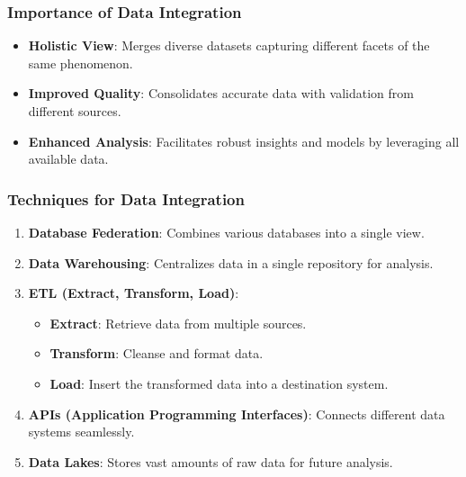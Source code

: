 \documentclass[aspectratio=169]{beamer}
\begin{document}
\begin{frame}[fragile]
    \frametitle{Importance of Data Integration}
    \begin{itemize}
        \item \textbf{Holistic View}: Merges diverse datasets capturing different facets of the same phenomenon.
        \item \textbf{Improved Quality}: Consolidates accurate data with validation from different sources.
        \item \textbf{Enhanced Analysis}: Facilitates robust insights and models by leveraging all available data.
    \end{itemize}
\end{frame}

\begin{frame}[fragile]
    \frametitle{Techniques for Data Integration}
    \begin{enumerate}
        \item \textbf{Database Federation}: Combines various databases into a single view.
        \item \textbf{Data Warehousing}: Centralizes data in a single repository for analysis.
        \item \textbf{ETL (Extract, Transform, Load)}: 
            \begin{itemize}
                \item \textbf{Extract}: Retrieve data from multiple sources.
                \item \textbf{Transform}: Cleanse and format data.
                \item \textbf{Load}: Insert the transformed data into a destination system.
            \end{itemize}
        \item \textbf{APIs (Application Programming Interfaces)}: Connects different data systems seamlessly.
        \item \textbf{Data Lakes}: Stores vast amounts of raw data for future analysis.
    \end{enumerate}
\end{frame}
\end{document}
